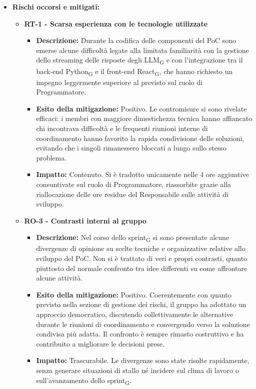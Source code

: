 ﻿\documentclass[a4paper, 10pt, colorlinks=true, linkcolor=black, urlcolor=blue, citecolor=blue, hidelinks]{article}
\begin{document}
\begin{itemize}
    \item \textbf{Rischi occorsi e mitigati:}
    \begin{itemize}
        \item \textbf{RT-1 - Scarsa esperienza con le tecnologie utilizzate}
        \begin{itemize}
            \item \textbf{Descrizione:} Durante la codifica delle componenti del PoC sono emerse alcune difficoltà legate alla limitata familiarità con la gestione dello streaming delle risposte degli LLM\textsubscript{G} e con l'integrazione tra il back-end Python\textsubscript{G} e il front-end React\textsubscript{G}, che hanno richiesto un impegno leggermente superiore al previsto sul ruolo di Programmatore.
            \item \textbf{Esito della mitigazione:} Positivo. Le contromisure si sono rivelate efficaci: i membri con maggiore dimestichezza tecnica hanno affiancato chi incontrava difficoltà e le frequenti riunioni interne di coordinamento hanno favorito la rapida condivisione delle soluzioni, evitando che i singoli rimanessero bloccati a lungo sullo stesso problema.
            \item \textbf{Impatto:} Contenuto. Si è tradotto unicamente nelle 4 ore aggiuntive consuntivate sul ruolo di Programmatore, riassorbite grazie alla riallocazione delle ore residue del Responsabile sulle attività di sviluppo.
        \end{itemize}
        \item \textbf{RO-3 - Contrasti interni al gruppo}
        \begin{itemize}
            \item \textbf{Descrizione:} Nel corso dello sprint\textsubscript{G} si sono presentate alcune divergenze di opinione su scelte tecniche e organizzative relative allo sviluppo del PoC. Non si è trattato di veri e propri contrasti, quanto piuttosto del normale confronto tra idee differenti su come affrontare alcune attività.
            \item \textbf{Esito della mitigazione:} Positivo. Coerentemente con quanto previsto nella sezione di gestione dei rischi, il gruppo ha adottato un approccio democratico, discutendo collettivamente le alternative durante le riunioni di coordinamento e convergendo verso la soluzione condivisa più adatta. Il confronto è sempre rimasto costruttivo e ha contribuito a migliorare le decisioni prese.
            \item \textbf{Impatto:} Trascurabile. Le divergenze sono state risolte rapidamente, senza generare situazioni di stallo né incidere sul clima di lavoro o sull'avanzamento dello sprint\textsubscript{G}.
        \end{itemize}
    \end{itemize}
\end{itemize}
\end{document}
